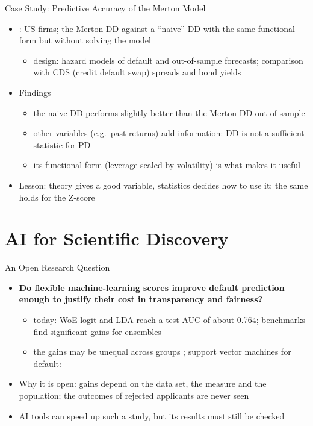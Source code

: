 \begin{frame}{Case Study: Predictive Accuracy of the Merton Model}
\itemsize{\small}
\begin{itemize}
    \item {}: US firms; the Merton DD against a ``naive'' DD with the same functional form but without solving the model
    \begin{itemize}
        \item design: hazard models of default and out-of-sample forecasts; comparison with CDS (credit default swap) spreads and bond yields
    \end{itemize}
    \item Findings
    \begin{itemize}
        \item the naive DD performs slightly better than the Merton DD out of sample
        \item other variables (e.g.\ past returns) add information: DD is not a sufficient statistic for PD
        \item its functional form (leverage scaled by volatility) is what makes it useful
    \end{itemize}
    \item Lesson: theory gives a good variable, statistics decides how to use it; the same holds for the Z-score
\end{itemize}
\end{frame}


\section{AI for Scientific Discovery}

\begin{frame}{An Open Research Question}
\itemsize{\small}
\begin{itemize}
    \item \textbf{Do flexible machine-learning scores improve default prediction enough to justify their cost in transparency and fairness?}
    \begin{itemize}
        \item today: WoE logit and LDA reach a test AUC of about 0.764; benchmarks find significant gains for ensembles 
        \item the gains may be unequal across groups ; support vector machines for default: 
    \end{itemize}
    \item Why it is open: gains depend on the data set, the measure and the population; the outcomes of rejected applicants are never seen
    \item AI tools can speed up such a study, but its results must still be checked 
\end{itemize}
\end{frame}

